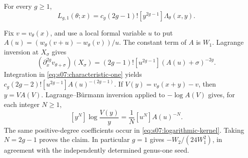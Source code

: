\begin{lmm}\label{lmm:s07:first-kernel}
For every $g\geq1$,
\begin{equation}\label{eq:s07:first-kernel}
 L_{g,1}(\theta;x)
 =c_g(2g-1)![y^{2g-1}]\Lambda_\theta(x,y).
\end{equation}
\end{lmm}
\begin{prf}
Fix $v=v_\theta(x)$, and use a local formal variable $u$ to put
$A(u)=(w_\theta(v+u)-w_\theta(v))/u$.
The constant term of $A$ is $W_1$. Lagrange inversion at
$X_\sigma$ gives
\[
 (\partial_x^{2g}v_{\theta+\sigma})(X_\sigma)
 =(2g-1)![u^{2g-1}](A(u)+\sigma)^{-2g}.
\]
Integration in \eqref{eq:s07:characteristic-one} yields
$c_g(2g-2)![u^{2g-1}]A(u)^{-(2g-1)}$.
If $V(y)=v_\theta(x+y)-v$, then $y=V A(V)$.
Lagrange--B\"urmann inversion applied to $-\log A(V)$ gives,
for each integer $N\geq1$,
\[
 [y^N]\log\frac{V(y)}y
                 =\frac1N[u^N]A(u)^{-N}.
\]
The same positive-degree coefficients occur in
\eqref{eq:s07:logarithmic-kernel}. Taking $N=2g-1$ proves the
claim. In particular $g=1$ gives $-W_2/(24W_1^2)$, in agreement
with the independently determined genus-one seed.
\end{prf}
